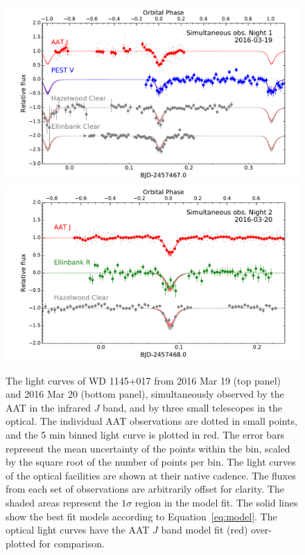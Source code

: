 \documentclass[useAMS,usenatbib]{mn2e}
\begin{document}
\begin{figure}
    \centering
    \includegraphics[width=15cm]{plots/20160319.pdf}\\
    \includegraphics[width=15cm]{plots/20160320.pdf}
    \caption{The light curves of WD 1145+017 from 2016 Mar 19 (top panel) and 2016 Mar 20 (bottom panel), simultaneously observed by the AAT in the infrared $J$ band, and by three small telescopes in the optical. The individual AAT observations are dotted in small points, and the 5 min binned light curve is plotted in red. The error bars represent the mean uncertainty of the points within the bin, scaled by the square root of the number of points per bin. The light curves of the optical facilities are shown at their native cadence. The fluxes from each set of observations are arbitrarily offset for clarity. The shaded areas represent the $1\sigma$ region in the model fit. The solid lines show the best fit models according to Equation~\ref{eq:model}. The optical light curves have the AAT $J$ band model fit (red) over-plotted for comparison. }
    \label{fig:lc_20160319}
\end{figure}
\end{document}
